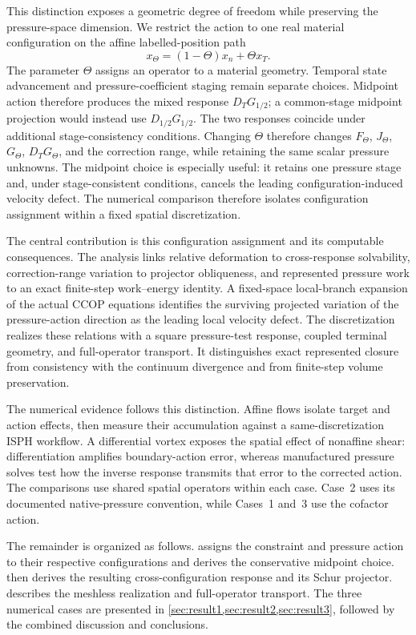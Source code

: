 \documentclass[11pt]{article}
\theoremstyle{plain}
\theoremstyle{definition}
\theoremstyle{remark}
\begin{document}
This distinction exposes a geometric degree of freedom while preserving the
pressure-space dimension.  We restrict the action to one real material configuration on the
affine labelled-position path
\[
 x_\Theta=(1-\Theta)x_n+\Theta x_T.
\]
The parameter $\Theta$ assigns an operator to a material geometry.  Temporal
state advancement and pressure-coefficient staging remain separate choices.
Midpoint action therefore produces the mixed response $D_TG_{1/2}$; a
common-stage midpoint projection would instead use $D_{1/2}G_{1/2}$.  The two
responses coincide under additional stage-consistency conditions.
Changing $\Theta$ therefore changes
$F_\Theta$, $J_\Theta$, $G_\Theta$, $D_TG_\Theta$, and the correction range,
while retaining the same scalar pressure unknowns.  The midpoint choice is
especially useful: it retains one pressure stage and, under stage-consistent
conditions, cancels the leading configuration-induced velocity defect.  The
numerical comparison therefore isolates configuration assignment within a
fixed spatial discretization.

The central contribution is this configuration assignment and its computable
consequences.  The analysis
links relative deformation to cross-response solvability, correction-range
variation to projector obliqueness, and represented pressure work to an exact
finite-step work--energy identity.  A fixed-space local-branch expansion of the actual CCOP equations
identifies the surviving projected variation of the pressure-action direction
as the leading local velocity defect.  The
discretization realizes these relations with a square
pressure-test response, coupled terminal geometry, and full-operator transport.
It distinguishes exact represented closure from consistency with the continuum
divergence and from finite-step volume preservation.

The numerical evidence follows this distinction.  Affine flows isolate target
and action effects, then measure their accumulation against a
same-discretization ISPH workflow.  A differential vortex exposes the spatial
effect of nonaffine shear: differentiation amplifies boundary-action error,
whereas manufactured pressure solves test how the inverse response transmits
that error to the corrected action.  The comparisons use shared spatial
operators within each case.  Case~2 uses its documented native-pressure
convention, while Cases~1 and~3 use the cofactor action.

The remainder is organized as follows.  
assigns the constraint and pressure action to their respective configurations
and derives the conservative midpoint choice.   then
derives the resulting cross-configuration response and its Schur projector.
 describes the meshless realization and
full-operator transport.  The three numerical cases are presented in
\cref{sec:result1,sec:result2,sec:result3}, followed by the combined discussion
and conclusions.
\end{document}
